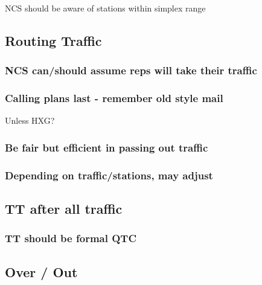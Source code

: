 \documentclass[11pt]{article}
\begin{document}
\begin{description}

\item[NCS should be aware of stations within simplex range]\label{sec-3.2.3.1}


\end{description}
\subsection{Routing Traffic}
\label{sec-3.3}

\subsubsection{NCS can/should assume reps will take their traffic}
\label{sec-3.3.1}

\subsubsection{Calling plans last - remember old style mail}
\label{sec-3.3.2}

\begin{description}

\item[Unless HXG?]\label{sec-3.3.2.1}


\end{description}
\subsubsection{Be fair but efficient in passing out traffic}
\label{sec-3.3.3}

\subsubsection{Depending on traffic/stations, may adjust}
\label{sec-3.3.4}

\subsection{TT after all traffic}
\label{sec-3.4}

\subsubsection{TT should be formal QTC}
\label{sec-3.4.1}

\subsection{Over / Out}
\label{sec-3.5}
\end{document}
